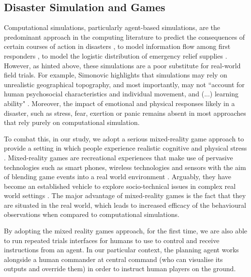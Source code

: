 \subsection{Disaster Simulation and Games} \label{sec:simulationvgames}
Computational simulations, particularly agent-based simulations, are the predominant approach in the computing literature to predict the consequences of certain courses of action in disasters \cite{Hawe2012}, to model information flow among first responders \cite{Robinson},  to model the logistic distribution of emergency relief supplies \cite{Lee2009}. However, as hinted above, these simulations are a poor substitute for real-world field trials. For example, Simonovic highlights that simulations may rely on unrealistic geographical topography, and most importantly, may not ``account for human psychosocial characteristics and individual movement, and (...) learning ability" \cite{Simonovic2010}.  Moreover, the impact of emotional and physical responses likely in a disaster, such as stress, fear, exertion or panic \cite{Drury2009} remains absent in most approaches that rely purely on computational simulation.

To combat this, in our study, we adopt a serious mixed-reality game approach to provide a setting in which people experience realistic cognitive and physical stress \cite{Fischer}. Mixed-reality games are recreational experiences that make use of pervasive technologies such as smart phones, wireless technologies and sensors with the aim of blending game events into a real world environment  \cite{Benford2005a} . Arguably, they have become an established vehicle to explore socio-technical issues in complex real world settings \cite{Crabtree2006a}. The major advantage of mixed-reality games is the fact that they are situated in the real world, which  leads to increased efficacy of the behavioural observations when compared to computational simulations. 

By adopting the mixed reality games approach, for the first time, we are also able to run repeated trials interfaces for humans to use to control and receive instructions from an agent. In our particular context, the planning agent works alongside a human commander at central command (who can visualise its outputs and override them) in order to instruct human players on the ground.

